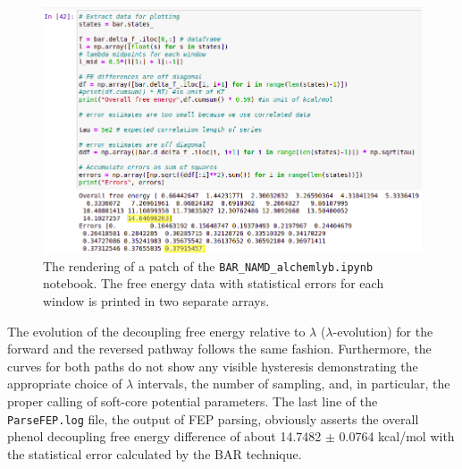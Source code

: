 \documentclass[9pt,tutorial]{livecoms}
\begin{document}
\begin{figure}[h!]
\centering
\includegraphics[width=\linewidth]{ipynb-cell4.png}
\caption{The rendering of a patch of the \texttt{BAR\_NAMD\_alchemlyb.ipynb} notebook. The free energy data with statistical errors for each window is printed in two separate arrays.}\label{fig:ipynb-cell4}
\end{figure}
















The evolution of the decoupling free energy relative to {$\lambda$} ({$\lambda$}-evolution) for the forward and the reversed pathway follows the same fashion. Furthermore, the curves for both paths do not show any visible hysteresis demonstrating the appropriate choice of {$\lambda$} intervals, the number of sampling, and, in particular, the proper calling of soft-core potential parameters. The last line of the \texttt{ParseFEP.log} file, the output of FEP parsing, obviously asserts the overall phenol decoupling free energy difference of about 14.7482 {$\pm$} 0.0764 kcal/mol with the statistical error calculated by the BAR technique.
\end{document}
